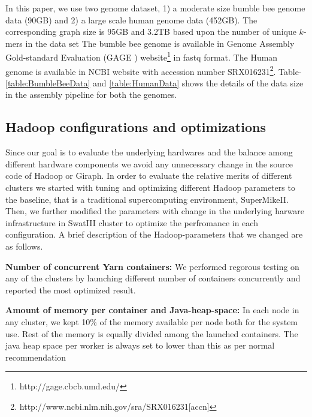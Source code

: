 \documentclass[conference]{IEEEtran}
\begin{document}
In this paper, we use two genome dataset, 1) a moderate size bumble bee genome data (90GB) and 2) a large scale human genome data (452GB).
The corresponding graph size is 95GB and 3.2TB based upon the number of unique $k$-mers in the data set
The bumble bee genome is available in Genome Assembly Gold-standard Evaluation (GAGE \cite{bio:gage}) website\footnote{http://gage.cbcb.umd.edu/} in fastq format.
The Human genome is available in NCBI website with accession number SRX016231\footnote{http://www.ncbi.nlm.nih.gov/sra/SRX016231[accn]}.
Table-\ref{table:BumbleBeeData} and \ref{table:HumanData} shows the details of the data size in the assembly pipeline for both the genomes.

\subsection {Hadoop configurations and optimizations} \label{HadoopConfigurationsAndoptimizations}
Since our goal is to evaluate the underlying hardwares and the balance among different hardware components we avoid any unnecessary change in the source code of Hadoop or Giraph. 
In order to evaluate the relative merits of different clusters we started with tuning and optimizing different Hadoop parameters to the baseline, that is a traditional supercomputing environment, SuperMikeII. Then, we further modified the parameters with change in the underlying harware infrastructure in SwatIII cluster to optimize the perfromance in each configuration.
A brief description of the Hadoop-parameters that we changed are as follows.
  
\textbf{Number of concurrent Yarn containers:} We performed regorous testing on any of the clusters by launching different number of containers concurrently and reported the most optimized result.

\textbf{Amount of memory per container and Java-heap-space:} In each node in any cluster, we kept 10\% of the memory available per node both for the system use. Rest of the memory is equally divided among the launched containers. The java heap space per worker is always set to lower than this as per normal recommendation
\end{document}
